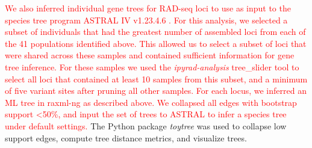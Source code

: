 \documentclass[11pt]{article}
\begin{document}
\textcolor{red}{
We also inferred individual gene trees for RAD-seq loci to use as input to the species tree program
ASTRAL IV v1.23.4.6 \citep{zhang_aster_2025}. 
For this analysis, we selected a subset of individuals that had the greatest 
number of assembled loci from each of the 41 populations identified above. 
This allowed us to select a subset of loci that were shared across these samples and 
contained sufficient information for gene tree inference.
For these samples we used the \emph{ipyrad-analysis} tree\_slider tool to select all loci that
contained at least 10 samples from this subset, and a minimum of five variant sites 
after pruning all other samples. For each locus, we inferred an ML tree in raxml-ng as described 
above. We collapsed all edges with bootstrap support <50\%, and input the set of trees to ASTRAL 
to infer a species tree under default settings.
}
The Python package \emph{toytree} \citep{eaton_toytree_2020} was used to collapse low support edges, 
compute tree distance metrics, and visualize trees.

\end{document}
